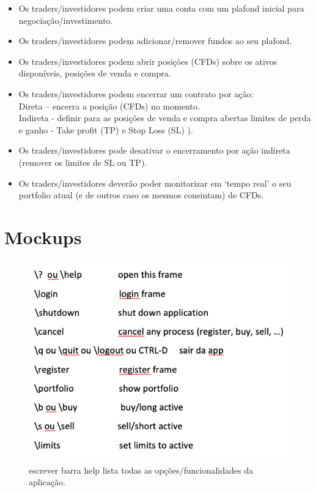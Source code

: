 \documentclass[11pt,a4paper]{report}%
\begin{document}
\begin{itemize}
    \item Os traders/investidores podem criar uma conta com um plafond inicial para negociação/investimento.
    \item Os traders/investidores podem adicionar/remover fundos ao seu plafond.
    \item Os traders/investidores podem abrir posições (CFDs) sobre os ativos disponíveis, posições de venda e compra.
    \item Os traders/investidores podem encerrar um contrato por ação:\\
Direta – encerra a posição (CFDs) no momento.\\
Indireta - definir para as posições de venda e compra abertas limites de perda e ganho - Take profit (TP) e Stop Loss (SL) ).\\
    \item Os traders/investidores pode desativar o encerramento por ação indireta (remover os limites de SL ou TP).
    \item Os traders/investidores deverão poder monitorizar em ‘tempo real’ o seu portfolio atual (e de outros caso os mesmos consintam) de CFDs.

\end{itemize}{}

\section{Mockups}

\begin{figure}[H]
	\centering
	\includegraphics[scale=0.6]{ui1.png}
	\caption{escrever barra help lista todas as opções/funcionalidades da aplicação.}
	\label{img:pag}
\end{figure}
\end{document}
